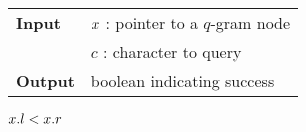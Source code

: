 \begin{figure*}[t]
\begin{center}
\begin{minipage}[t]{.6\textwidth}
\begin{algorithm}[H]
\begin{tabular}{ll}
\textbf{Input}  & $x$ : pointer to a $q$-gram node\\
				& $c$ : character to query\\
\textbf{Output} & boolean indicating success\\
\end{tabular}
\begin{algorithmic}[1]
	\State \Return \False
\EndIf
{}
\State \Return $x.l < x.r$
\end{algorithmic}
\label{alg:qgram-godownc}
\end{algorithm}
\end{minipage}
\end{center}
\end{figure*}



